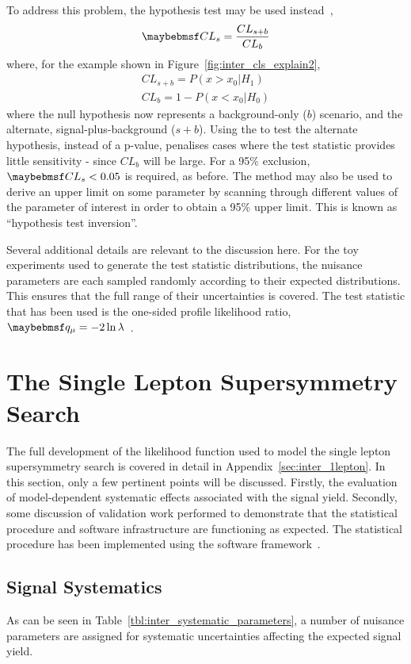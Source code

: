 To address this problem, the \CLs hypothesis test may be used instead~\cite{cls},
\begin{equation*}
\CLs = \frac{CL_{s+b}}{CL_{b}}
\end{equation*}
where, for the example shown in Figure~\ref{fig:inter_cls_explain2},
\begin{eqnarray*}
CL_{s+b} = P\left(x > x_0 | H_1\right)\\
CL_b = 1 - P\left(x < x_0 | H_0\right)
\end{eqnarray*}
where the null hypothesis now represents a background-only ($b$) scenario, and
the alternate, signal-plus-background ($s+b$). Using the \CLs to test the
alternate hypothesis, instead of a p-value, penalises cases where the test
statistic provides little sensitivity - since $CL_b$ will be large. For a 95\%
exclusion, $\CLs < 0.05$ is required, as before. The \CLs method may also be
used to derive an upper limit on some parameter by scanning through different
values of the parameter of interest in order to obtain a 95\% upper limit. This
is known as ``hypothesis test inversion''.

Several additional details are relevant to the discussion here. For the toy
experiments used to generate the test statistic distributions, the nuisance
parameters are each sampled randomly according to their expected
distributions. This ensures that the full range of their uncertainties is
covered. The test statistic that has been used is the one-sided profile
likelihood ratio, $\qmu=-2\ln\lambda$~\cite{cl_computation,
  modified_frequentist, atlas_cms_higgs}.

\section{The Single Lepton Supersymmetry Search}
The full development of the likelihood function used to model the single lepton
supersymmetry search is covered in detail in
Appendix~\ref{sec:inter_1lepton}. In this section, only a few pertinent points
will be discussed. Firstly, the evaluation of model-dependent systematic effects
associated with the signal yield. Secondly, some discussion of validation work
performed to demonstrate that the statistical procedure and software
infrastructure are functioning as expected. The statistical procedure has been
implemented using the \roostats software framework~\cite{roostats, roostats_web}.

\subsection{Signal Systematics}
As can be seen in Table~\ref{tbl:inter_systematic_parameters}, a number of
nuisance parameters are assigned for systematic uncertainties affecting the
expected signal yield.

